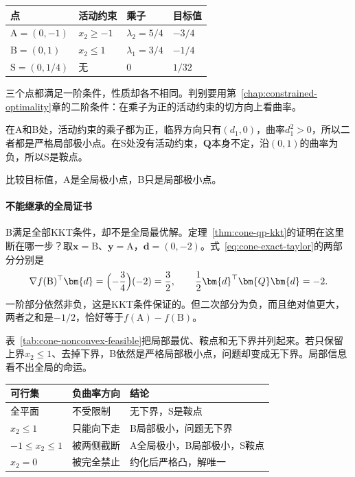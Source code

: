 \begin{BookInlineTable}
  \centering
  \begin{tabular}{llll}
    \toprule
    点 & 活动约束 & 乘子 & 目标值\\
    \midrule
    $\mathrm{A}=(0,-1)$ & $x_2\geq-1$ & $\lambda_2=5/4$ & $-3/4$\\
    $\mathrm{B}=(0,1)$ & $x_2\leq1$ & $\lambda_1=3/4$ & $-1/4$\\
    $\mathrm{S}=(0,1/4)$ & 无 & $0$ & $1/32$\\
    \bottomrule
  \end{tabular}
  \caption{目标~\eqref{eq:cone-nonconvex-objective}在带形可行集上的三个KKT点。}
  \label{tab:cone-nonconvex-kkt}
\end{BookInlineTable}

三个点都满足一阶条件，性质却各不相同。判别要用第~\ref{chap:constrained-optimality}章的二阶条件：在乘子为正的活动约束的切方向上看曲率。

在A和B处，活动约束的乘子都为正，临界方向只有$(d_1,0)$，曲率$d_1^2>0$，所以二者都是严格局部极小点。在S处没有活动约束，$\bm{Q}$本身不定，沿$(0,1)$的曲率为负，所以S是鞍点。

比较目标值，A是全局极小点，B只是局部极小点。

\paragraph{不能继承的全局证书}
B满足全部KKT条件，却不是全局最优解。定理~\ref{thm:cone-qp-kkt}的证明在这里断在哪一步？取$\bm{x}=\mathrm{B}$、$\bm{y}=\mathrm{A}$，$\bm{d}=(0,-2)$。式~\eqref{eq:cone-exact-taylor}的两部分分别是
\[
 \nabla f(\mathrm{B})^\top\bm{d}=\Bigl(-\frac34\Bigr)(-2)=\frac32,\qquad
 \frac12\bm{d}^\top\bm{Q}\bm{d}=-2.
\]
一阶部分依然非负，这是KKT条件保证的。但二次部分为负，而且绝对值更大，两者之和是$-1/2$，恰好等于$f(\mathrm{A})-f(\mathrm{B})$。

表~\ref{tab:cone-nonconvex-feasible}把局部最优、鞍点和无下界并列起来。若只保留上界$x_2\leq1$、去掉下界，B依然是严格局部极小点，问题却变成无下界。局部信息看不出全局的命运。

\begin{BookInlineTable}
  \centering
  \begin{tabular}{lll}
    \toprule
    可行集 & 负曲率方向 & 结论\\
    \midrule
    全平面 & 不受限制 & 无下界，S是鞍点\\
    $x_2\leq1$ & 只能向下走 & B局部极小，问题无下界\\
    $-1\leq x_2\leq1$ & 被两侧截断 & A全局极小，B局部极小，S鞍点\\
    $x_2=0$ & 被完全禁止 & 约化后严格凸，解唯一\\
    \bottomrule
  \end{tabular}
  \caption{同一目标~\eqref{eq:cone-nonconvex-objective}在不同可行集上的结果。约束可以限制负曲率方向，但限制的方式决定结论。}
  \label{tab:cone-nonconvex-feasible}
\end{BookInlineTable}


